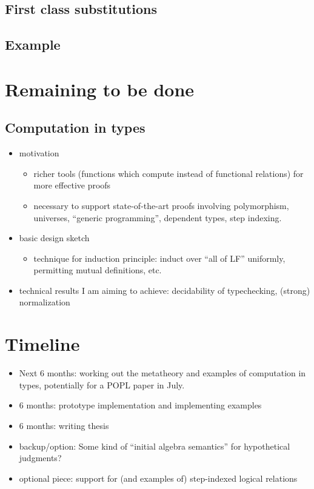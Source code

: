 \documentclass{article}
\begin{document}
\subsection{First class substitutions}

\subsection{Example}
\section{Remaining to be done}
\subsection{Computation in types}
\begin{itemize}
\item motivation
\begin{itemize}
\item richer tools (functions which compute instead of functional
relations) for more effective proofs
\item necessary to support state-of-the-art proofs involving polymorphism,
universes, ``generic programming'', dependent types, step indexing.
\end{itemize}
\item basic design sketch
\begin{itemize}
\item technique for induction principle: induct over ``all of LF'' uniformly, permitting mutual definitions, etc.
\end{itemize}
\item technical results I am aiming to achieve: decidability
  of typechecking, (strong) normalization
\end{itemize}
\section{Timeline}
\begin{itemize}
\item Next 6 months: working out the metatheory and examples of computation in
types, potentially for a POPL paper in July.
\item 6 months: prototype implementation and implementing examples
\item 6 months: writing thesis
\item backup/option: Some kind of ``initial algebra semantics'' for hypothetical judgments?
\item optional piece: support for (and examples of) step-indexed
  logical relations
\end{itemize}
\end{document}
